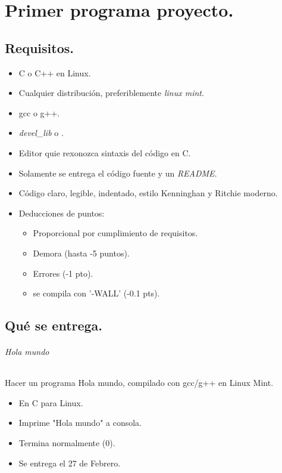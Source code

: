 \part{Primer programa proyecto.}
\chapter{Requisitos.}

\begin{itemize}
	\item C o C++ en Linux.
	\item Cualquier distribuci\'{o}n, preferiblemente \textit{linux mint}.
	\item gcc o g++.
	\item \textit{devel_lib} o .
	\item Editor quie rexonozca sintaxis del c\'{o}digo en C.
	\item Solamente se entrega el c\'{o}digo fuente y un \textit{README}.
	\item C\'{o}digo claro, legible, indentado, estilo Kenninghan y Ritchie moderno.
	\item Deducciones de puntos:
		\begin{itemize}
			\item Proporcional por cumplimiento de requisitos.
			\item Demora (hasta -5 puntos).
			\item Errores (-1 pto).
			\item se compila con '-WALL' (-0.1 pts).
		\end{itemize}
\end{itemize}

\chapter{Qu\'{e} se entrega.}

\paragraph{Hola mundo} Hacer un programa Hola mundo, compilado con gcc/g++ en Linux Mint.

\begin{itemize}
	\item En C para Linux.
	\item Imprime "Hola mundo" a consola.
	\item Termina normalmente (0).
	\item Se entrega el 27 de Febrero.
\end{itemize}

